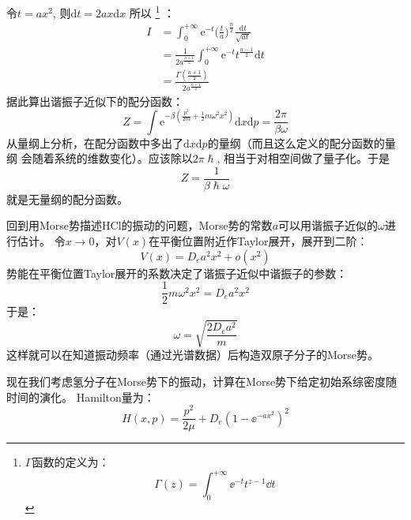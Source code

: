     令$t = ax^2$, 则$\mathrm{d}t = 2ax\mathrm{d}x$
    所以
    \footnote{$\Gamma$函数的定义为：
    \begin{equation}
        \Gamma(z) = \int_{0}^{+\infty}\ee^{-t}t^{z-1}\dd t
    \end{equation}
    }
    ：
    \begin{equation}
        \begin{split}
            I &= \int_0^{+\infty} \mathrm{e}^{-t} \bigg(\frac ta\bigg)^{\frac n2} \frac {\mathrm{d}t}{\sqrt{at}}\\
            &= \frac 1{2a^{\frac {n+1}2}} \int_0^{+\infty} \mathrm{e}^{-t} t^{\frac {n-1}2} \mathrm{d}t\\
            &= \frac {\Gamma(\frac {n+1}2)}{2a^{\frac {n+1}2}}
        \end{split}
    \end{equation}
    据此算出谐振子近似下的配分函数：
    \begin{equation}
        Z = \int \mathrm{e}^{-\beta (\frac {p^2}{2m} + \frac 12 m\omega^2 x^2)} \mathrm{d}x\mathrm{d}p = \frac {2\pi}{\beta \omega}
    \end{equation}
    从量纲上分析，在配分函数中多出了$\mathrm{d}x\mathrm{d}p$的量纲（而且这么定义的配分函数的量纲
    会随着系统的维数变化）。应该除以$2\pi\hslash$, 相当于对相空间做了量子化。于是
    \begin{equation}
        Z = \frac 1{\beta \hslash \omega}
    \end{equation}
    就是无量纲的配分函数。
    \par 
    回到用Morse势描述HCl的振动的问题，Morse势的常数$a$可以用谐振子近似的$\omega$进行估计。
    令$x \to 0 $，对$V(x)$在平衡位置附近作Taylor展开，展开到二阶：
    \begin{equation}
        V(x) = D_e a^2 x^2 + o(x^2)
    \end{equation}
    势能在平衡位置Taylor展开的系数决定了谐振子近似中谐振子的参数：
    \begin{equation}
        \frac 12 m\omega^2x^2 = D_e a^2 x^2
    \end{equation}
    于是：
    \begin{equation}
        \omega = \sqrt{\frac {2D_ea^2}m}
        \label{omega of Morse}
    \end{equation}
    这样就可以在知道振动频率（通过光谱数据）后构造双原子分子的Morse势。
    \par 
    现在我们考虑氢分子在Morse势下的振动，计算在Morse势下给定初始系综密度随时间的演化。
    Hamilton量为：
    \begin{equation}
        H(x, p) = \frac{p^2}{2\mu} + D_e(1-\ee^{-ax^2})^2
    \end{equation}

